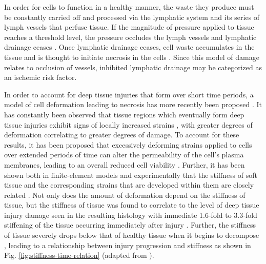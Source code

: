 			In order for cells to function in a healthy manner, the waste they produce must be constantly carried off and processed via the lymphatic system and its series of lymph vessels that perfuse tissue. If the magnitude of pressure applied to tissue reaches a threshold level, the pressure occludes the lymph vessels and lymphatic drainage ceases \cite{miller81}. Once lymphatic drainage ceases, cell waste accumulates in the tissue and is thought to initiate necrosis in the cells \cite{krouskop78,reddy81,braden87}. Since this model of damage relates to occlusion of vessels, inhibited lymphatic drainage may be categorized as an ischemic risk factor.

			In order to account for deep tissue injuries that form over short time periods, a model of cell deformation leading to necrosis has more recently been proposed \cite{landsman95,bouten01,wang05}. It has constantly been observed that tissue regions which eventually form deep tissue injuries exhibit signs of locally increased strains \cite{stekelenburg06,ceelen08,linderganz08,portnoy09,solis12-03}, with greater degrees of deformation correlating to greater degrees of damage. To account for these results, it has been proposed that excessively deforming strains applied to cells over extended periods of time can alter the permeability of the cell's plasma membranes, leading to an overall reduced cell viability \cite{slomka12}. Further, it has been shown both in finite-element models and experimentally that the stiffness of soft tissue and the corresponding strains that are developed within them are closely related \cite{loerakker13,gefen05,linderganz09,nagel09}. Not only does the amount of deformation depend on the stiffness of tissue, but the stiffness of tissue was found to correlate to the level of deep tissue injury damage seen in the resulting histology \cite{gefen04} with immediate 1.6-fold to 3.3-fold stiffening of the tissue occurring immediately after injury \cite{gefen05,linderganz04}. Further, the stiffness of tissue severely drops below that of healthy tissue when it begins to decompose \cite{gefen05,dimaio01}, leading to a relationship between injury progression and stiffness as shown in Fig. \ref{fig:stiffness-time-relation} (adapted from \cite{gefen09}).

